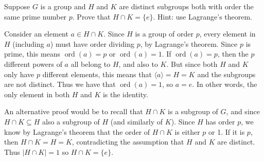 \documentclass[11pt]{exam}
\DeclareMathOperator{\ord}{ord}
\DeclareMathOperator{\lcm}{lcm}
\begin{document}
\begin{questions}




  
  \question[4] Suppose $G$ is a group and $H$ and $K$ are distinct subgroups both with order the same prime number $p$.  Prove that $H \cap K = \{e\}$.  Hint: use Lagrange's theorem.

  \begin{solution}
  Consider an element $a \in H \cap K$.  Since $H$ is a group of order $p$, every element in $H$ (including $a$) must have order dividing $p$, by Lagrange's theorem.  Since $p$ is prime, this means $\ord(a) = p$ or $\ord(a) = 1$.  If $\ord(a) = p$, then the $p$ different powers of $a$ all belong to $H$, and also to $K$.  But since both $H$ and $K$ only have $p$ different elements, this means that $\langle a \rangle = H = K$ and the subgroups are not distinct.  Thus we have that $\ord(a) = 1$, so $a = e$.  In other words, the only element in both $H$ and $K$ is the identity.

  An alternative proof would be to recall that $H \cap K$ is a subgroup of $G$, and since $H \cap K \subseteq H$ also a subgroup of $H$ (and similarly of $K$).  Since $H$ has order $p$, we know by Lagrange's theorem that the order of $H\cap K$ is either $p$ or 1.  If it is $p$, then $H \cap K = H = K$, contradicting the assumption that $H$ and $K$ are distinct.  Thus $|H\cap K| = 1$ so $H \cap K = \{e\}$.
  \end{solution}


\end{questions}
\end{document}
